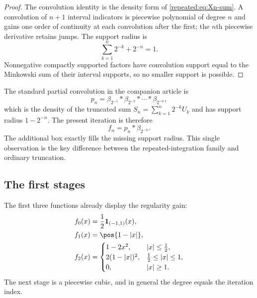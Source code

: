 \documentclass[11pt,oneside]{article}
\theoremstyle{definition}
\theoremstyle{remark}
\begin{document}
\begin{proof}
The convolution identity is the density form of \eqref{repeated:eq:Xn-sum}.  A convolution of $n+1$
interval indicators is piecewise polynomial of degree $n$ and gains one order of continuity
at each convolution after the first; the $n$th piecewise derivative retains jumps.  The
support radius is
\[
 \sum_{k=1}^{n}2^{-k}+2^{-n}=1.
\]
Nonnegative compactly supported factors have convolution support equal to the Minkowski sum
of their interval supports, so no smaller support is possible.
\end{proof}

The standard partial convolution in the companion article is
\begin{equation}
 p_n=\beta_{2^{-1}}*\beta_{2^{-2}}*\cdots*\beta_{2^{-n}},   \label{repeated:eq:pn}
\end{equation}
which is the density of the truncated sum
$S_n=\sum_{k=1}^{n}2^{-k}U_k$ and has support radius $1-2^{-n}$.  The present iteration is
therefore
\begin{equation}
 f_n=p_n*\beta_{2^{-n}}.                                   \label{repeated:eq:fn-pn}
\end{equation}
The additional box exactly fills the missing support radius.  This single observation is the
key difference between the repeated-integration family and ordinary truncation.

\subsection{The first stages}

The first three functions already display the regularity gain:
\begin{align}
 f_0(x)&=\frac12\mathbf 1_{(-1,1)}(x),                                      \label{repeated:eq:f0}\\
 f_1(x)&=\pos{1-|x|},                                                        \label{repeated:eq:f1}\\
 f_2(x)&=
 \begin{cases}
  1-2x^2,&|x|\le\tfrac12,\\
  2(1-|x|)^2,&\tfrac12\le|x|\le1,\\
  0,&|x|\ge1.
 \end{cases}                                                               \label{repeated:eq:f2}
\end{align}
The next stage is a piecewise cubic, and in general the degree equals the iteration index.
\end{document}
